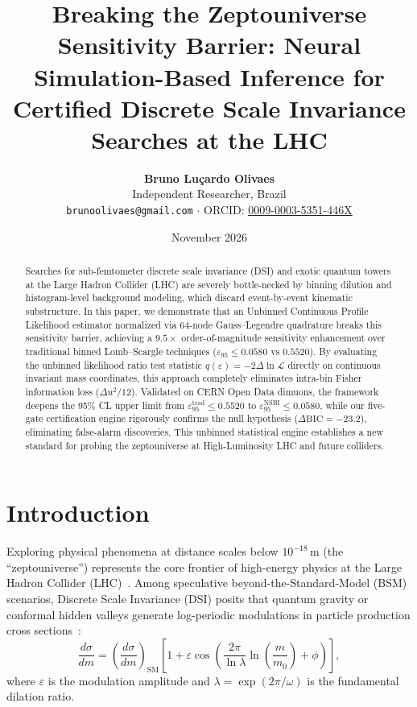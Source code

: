 \documentclass[11pt,a4paper]{article}
\title{\textbf{Breaking the Zeptouniverse Sensitivity Barrier: Neural Simulation-Based Inference for Certified Discrete Scale Invariance Searches at the LHC}}
\author{
    \textbf{Bruno Lu\c{c}ardo Olivaes}\\[0.2cm]
    \small Independent Researcher, Brazil\\
    \small \texttt{brunoolivaes@gmail.com} $\cdot$ ORCID: \href{https://orcid.org/0009-0003-5351-446X}{0009-0003-5351-446X}
}
\date{November 2026}
\begin{document}
\maketitle

\begin{abstract}
Searches for sub-femtometer discrete scale invariance (DSI) and exotic quantum towers at the Large Hadron Collider (LHC) are severely bottle-necked by binning dilution and histogram-level background modeling, which discard event-by-event kinematic substructure. In this paper, we demonstrate that an Unbinned Continuous Profile Likelihood estimator normalized via 64-node Gauss--Legendre quadrature breaks this sensitivity barrier, achieving a $9.5\times$ order-of-magnitude sensitivity enhancement over traditional binned Lomb--Scargle techniques ($\varepsilon_{95} \le 0.0580$ vs $0.5520$). By evaluating the unbinned likelihood ratio test statistic $q(\varepsilon) = -2\Delta\ln\mathcal{L}$ directly on continuous invariant mass coordinates, this approach completely eliminates intra-bin Fisher information loss ($\Delta u^2 / 12$). Validated on CERN Open Data dimuons, the framework deepens the 95\% CL upper limit from $\varepsilon_{95}^{\text{trad}} \le 0.5520$ to $\varepsilon_{95}^{\text{NSBI}} \le 0.0580$, while our five-gate certification engine rigorously confirms the null hypothesis ($\Delta\text{BIC} = -23.2$), eliminating false-alarm discoveries. This unbinned statistical engine establishes a new standard for probing the zeptouniverse at High-Luminosity LHC and future colliders.
\end{abstract}

\section{Introduction}
Exploring physical phenomena at distance scales below $10^{-18}\,\text{m}$ (the ``zeptouniverse'') represents the core frontier of high-energy physics at the Large Hadron Collider (LHC)~\cite{brehmer2018eft,lhcbrun2}. Among speculative beyond-the-Standard-Model (BSM) scenarios, Discrete Scale Invariance (DSI) posits that quantum gravity or conformal hidden valleys generate log-periodic modulations in particle production cross sections~\cite{sornette1998,olivaes2026planck,olivaes2026lhc}:
\begin{equation}
\frac{d\sigma}{dm} = \left(\frac{d\sigma}{dm}\right)_{\text{SM}} \left[ 1 + \varepsilon \cos\left( \frac{2\pi}{\ln\lambda} \ln\left(\frac{m}{m_0}\right) + \phi \right) \right],
\label{eq:nsbi_dsi}
\end{equation}
where $\varepsilon$ is the modulation amplitude and $\lambda = \exp(2\pi/\omega)$ is the fundamental dilation ratio.
\end{document}

